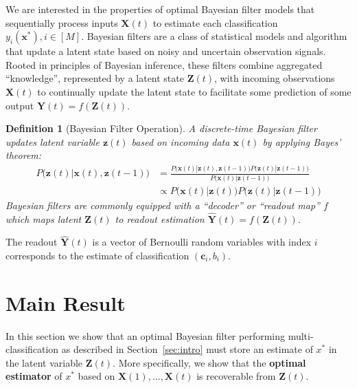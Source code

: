 \documentclass[12pt]{article}
\newtheorem{definition}{Definition}
\begin{document}
We are interested in the properties of optimal Bayesian filter models that sequentially process inputs $\mathbf X(t)$ to estimate each classification $y_i(\mathbf x^*), i\in [M]$. 
Bayesian filters are a class of statistical models and algorithm that update a latent state based on noisy and uncertain observation signals. 
Rooted in principles of Bayesian inference, these filters combine aggregated ``knowledge'', represented by a latent state $\mathbf Z(t)$, with incoming observations $\mathbf X(t)$ to continually update the latent state to facilitate some prediction of some output $\mathbf Y(t) = f(\mathbf Z(t))$. 


\begin{definition}[Bayesian Filter Operation]
	\label{def:bayesian_filter}
	A discrete-time Bayesian filter updates latent variable $\mathbf z(t)$
	based on incoming data $\mathbf x(t)$ by applying Bayes' theorem: 
	\begin{align}
		\label{eqn:bayes_filter}
		P \big(\mathbf z(t) | \mathbf  x(t), \mathbf z(t-1)\big) &= \frac{
			P\big(\mathbf x(t) | \mathbf z(t), \mathbf z(t-1)\big) 
			P\big(\mathbf z(t) | \mathbf z(t-1)\big)
		}{
			P\big(\mathbf x(t) | \mathbf z(t-1)\big)
		} \\
		&\propto P\big(\mathbf x(t) | \mathbf z(t) \big) 
			P\big(\mathbf z(t) | \mathbf z(t-1)\big)
	\end{align}
	Bayesian filters are commonly equipped with a ``decoder'' or ``readout
	map'' $f$ which maps latent $\mathbf Z(t)$ to readout estimation
	$\hat{\mathbf Y}(t) = f(\mathbf Z(t))$.
\end{definition}


The readout $\hat{\mathbf Y}(t)$ is a vector of Bernoulli random variables with index $i$ corresponds to the estimate of classification $(\mathbf c_i, b_i)$. 










\section{Main Result}

In this section we show that an optimal Bayesian filter performing multi-classification as described in Section~\ref{sec:intro} must store an estimate of $x^*$ in the latent variable $\mathbf Z(t)$. 
More specifically, we show that the \textbf{optimal estimator} of $x^*$ based on $\mathbf X(1), \dots, \mathbf X(t)$ is recoverable from $\mathbf Z(t)$.
\end{document}
